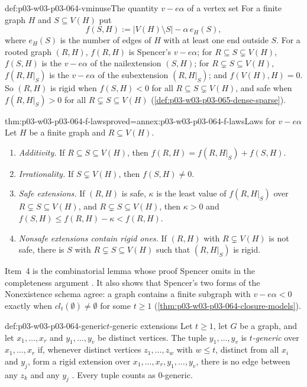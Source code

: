 \begin{hbdefinition}{def:p03-w03-p03-064-vminuse}{The quantity \(v-e\alpha\) of a vertex set}
For a finite graph \(H\) and \(S\subseteq V(H)\) put
\[
  f(S,H):=|V(H)\setminus S|-\alpha\,e_H(S),
\]
where \(e_H(S)\) is the number of edges of \(H\) with at least one end
outside \(S\).  For a rooted graph \((R,H)\), \(f(R,H)\) is Spencer's
\(v-e\alpha\); for \(R\subseteq S\subsetneq V(H)\), \(f(S,H)\) is the
\(v-e\alpha\) of the nailextension \((S,H)\); for \(R\subsetneq S\subseteq
V(H)\), \(f(R,H|_S)\) is the \(v-e\alpha\) of the subextension
\((R,H|_S)\); and \(f(V(H),H)=0\).  So \((R,H)\) is rigid when
\(f(S,H)<0\) for all \(R\subseteq S\subsetneq V(H)\), and safe when
\(f(R,H|_S)>0\) for all \(R\subsetneq S\subseteq V(H)\)
(\cref{def:p03-w03-p03-065-dense-sparse}).
\end{hbdefinition}

\begin{hblemma}{thm:p03-w03-p03-064-f-laws}{proved=annex:p03-w03-p03-064-f-laws}{Laws for \(v-e\alpha\)}
Let \(H\) be a finite graph and \(R\subseteq V(H)\).
\begin{enumerate}
\item \emph{Additivity.}  If \(R\subseteq S\subseteq V(H)\), then
  \(f(R,H)=f(R,H|_S)+f(S,H)\).
\item \emph{Irrationality.}  If \(S\subsetneq V(H)\), then \(f(S,H)\neq0\).
\item \emph{Safe extensions.}  If \((R,H)\) is safe, \(\kappa\) is the least
  value of \(f(R,H|_S)\) over \(R\subsetneq S\subseteq V(H)\), and
  \(R\subsetneq S\subseteq V(H)\), then \(\kappa>0\) and
  \(f(S,H)\leq f(R,H)-\kappa<f(R,H)\).
\item \emph{Nonsafe extensions contain rigid ones.}  If \((R,H)\) with
  \(R\subsetneq V(H)\) is not safe, there is \(S\) with
  \(R\subsetneq S\subseteq V(H)\) such that \((R,H|_S)\) is rigid.
\end{enumerate}
\end{hblemma}

Item~4 is the combinatorial lemma whose proof Spencer omits in the
completeness argument \cite[p.~12]{Spencer2007LogicRandomStructuresAuthor}.
It also shows that Spencer's two forms of the Nonexistence schema agree:
a graph contains a finite subgraph with \(v-e\alpha<0\) exactly when
\(cl_t(\emptyset)\neq\emptyset\) for some \(t\geq1\)
(\cref{thm:p03-w03-p03-064-closure-models}).

\begin{hbdefinition}{def:p03-w03-p03-064-generic}{\(t\)-generic extensions}
Let \(t\geq1\), let \(G\) be a graph, and let \(x_1,\ldots,x_r\) and
\(y_1,\ldots,y_v\) be distinct vertices.  The tuple \(y_1,\ldots,y_v\) is
\emph{\(t\)-generic} over \(x_1,\ldots,x_r\) if, whenever distinct vertices
\(z_1,\ldots,z_w\) with \(w\leq t\), distinct from all \(x_i\) and \(y_j\),
form a rigid extension over \(x_1,\ldots,x_r,y_1,\ldots,y_v\), there is no
edge between any \(z_k\) and any \(y_j\)
\cite[p.~10]{Spencer2007LogicRandomStructuresAuthor}.  Every tuple counts as
\(0\)-generic.
\end{hbdefinition}

